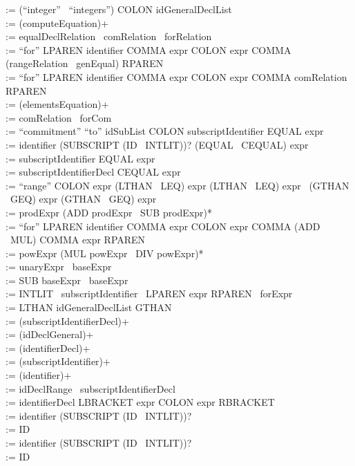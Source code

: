 {\begin{minipage}[c]{6 in}
 := (``integer'' \vline~``integers'') COLON idGeneralDeclList\\
 := (computeEquation)+\\
 := equalDeclRelation  \vline~comRelation  \vline~forRelation\\
 := ``for'' LPAREN identifier COMMA expr COLON expr COMMA
			   (rangeRelation  \vline~genEqual) RPAREN\\
 := ``for'' LPAREN identifier COMMA expr COLON expr COMMA
		  comRelation RPAREN\\
 := (elementsEquation)+\\
 := comRelation  \vline~forCom\\
 := ``commitment'' ``to'' idSubList COLON subscriptIdentifier
			   EQUAL expr\\
 := identifier (SUBSCRIPT (ID  \vline~INTLIT))? (EQUAL \vline~CEQUAL) expr\\
 := subscriptIdentifier EQUAL expr\\
 := subscriptIdentifierDecl CEQUAL expr\\
 := ``range'' COLON expr (LTHAN \vline~LEQ) expr
(LTHAN \vline~LEQ) expr  \vline~(GTHAN \vline~GEQ) expr (GTHAN \vline~GEQ) expr\\
 := prodExpr (ADD prodExpr  \vline~SUB prodExpr)*\\
 := ``for'' LPAREN identifier COMMA expr COLON expr COMMA
		   (ADD  \vline~MUL) COMMA expr RPAREN\\
 := powExpr (MUL powExpr  \vline~DIV powExpr)*\\
 := unaryExpr  \vline~baseExpr\\
 := SUB baseExpr  \vline~baseExpr\\
 := INTLIT  \vline~subscriptIdentifier  \vline~LPAREN expr RPAREN  \vline~forExpr\\
 := LTHAN idGeneralDeclList GTHAN\\
 := (subscriptIdentifierDecl)+\\
 := (idDeclGeneral)+\\
 := (identifierDecl)+\\
 := (subscriptIdentifier)+\\
 := (identifier)+\\
 := idDeclRange  \vline~subscriptIdentifierDecl\\
 := identifierDecl LBRACKET expr COLON expr RBRACKET\\
 := identifier (SUBSCRIPT (ID  \vline~INTLIT))?\\
 := ID\\
 := identifier (SUBSCRIPT (ID  \vline~INTLIT))?\\
 := ID\\


\end{minipage}}
